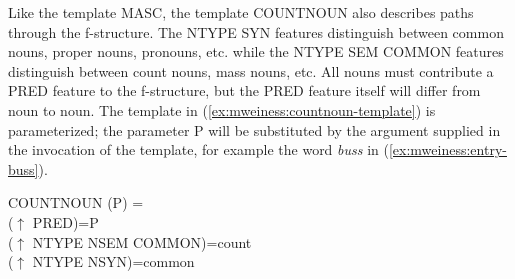 \documentclass[output=paper]{langsci/langscibook}
\begin{document}
%
%


Like the template MASC, the template COUNTNOUN also describes paths through the f-structure.
The NTYPE SYN features distinguish between common nouns, proper nouns, pronouns, etc. while the NTYPE SEM COMMON features distinguish between count nouns, mass nouns, etc.
All nouns must contribute a PRED feature to the f-structure, but the PRED feature itself will differ from noun to noun.
The template in (\ref{ex:mweiness:countnoun-template}) is parameterized; the parameter P will be substituted by the argument supplied in the invocation of the template, for example the word \textit{buss} in (\ref{ex:mweiness:entry-buss}).


\ea\label{ex:mweiness:countnoun-template}
{\small 
COUNTNOUN (P) = \\
\hspace{2em}  ($\uparrow$ PRED)=P \\
\hspace{2em}  ($\uparrow$ NTYPE NSEM COMMON)=count \\
\hspace{2em}  ($\uparrow$ NTYPE NSYN)=common \\
}
\z
\end{document}
